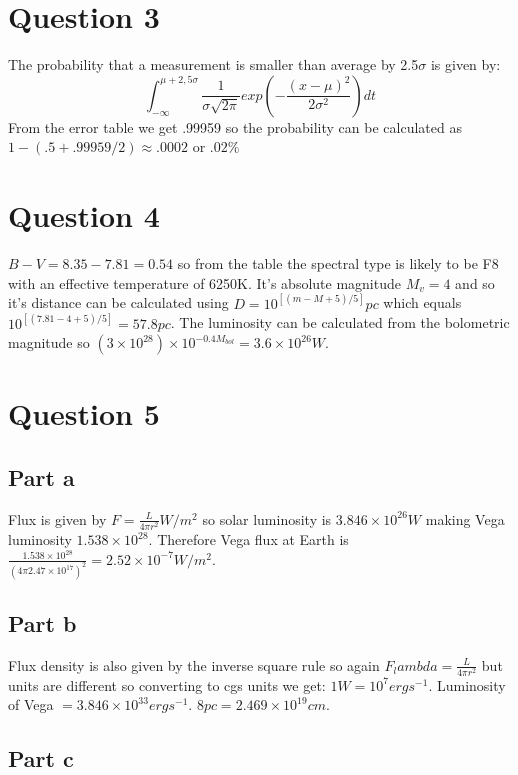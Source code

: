 \documentclass[a4paper,12pt]{article}
\begin{document}
\section{Question 3}
The probability that a measurement is smaller than average by 2.5$\sigma$ is given by:
\begin{equation}
\int_{-\infty}^{\mu+2,5\sigma}\frac{1}{\sigma\sqrt{2\pi}}exp\left(-\frac{\left(x-\mu\right)^2}{2\sigma^2}\right)dt
\end{equation}
From the error table we get .99959 so the probability can be calculated as $1-(.5+.99959/2)\approx .0002$ or $.02\%$

\section{Question 4}
$B-V=8.35-7.81=0.54$ so from the table the spectral type is likely to be F8 with an effective temperature of 6250K.
It's absolute magnitude $M_v=4$ and so it's distance can be calculated using $D=10^{\left[\left(m-M+5\right)/5\right]} pc$ which 
equals $10^{\left[\left(7.81-4+5\right)/5\right]}=57.8 pc$.
The luminosity can be calculated from the bolometric magnitude so $\left(3\times10^{28}\right)\times10^{-0.4M_{bol}}=3.6\times10^{26} W$.

\section{Question 5}
\subsection{Part a}
Flux is given by $F=\frac{L}{4\pi r^2} W/m^2$ so solar luminosity is $3.846\times10^{26}W$ making Vega luminosity $1.538\times10^{28}$. 
Therefore Vega flux at Earth is $\frac{1.538\times10^{28}}{\left(4\pi 2.47\times10^{17}\right)^2}=2.52\times10^{-7} W/m^2$.
\subsection{Part b}
Flux density is also given by the inverse square rule so again $F_lambda=\frac{L}{4\pi r^2}$ but units are different so converting to cgs units we get:
$1W=10^7 erg s^{-1}$. Luminosity of Vega $=3.846\times10^{33} erg s^{-1}$. $8pc=2.469\times10^{19} cm$.

\subsection{Part c}
\end{document}
